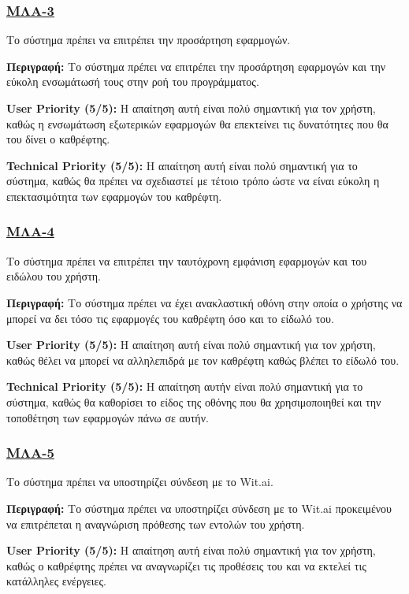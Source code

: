 \subsubsection{\underline{ΜΛΑ-3}}
\noindent Το σύστημα πρέπει να επιτρέπει την προσάρτηση εφαρμογών.

\noindent\textbf{Περιγραφή:} Το σύστημα πρέπει να επιτρέπει την προσάρτηση εφαρμογών και την εύκολη ενσωμάτωσή τους στην ροή του προγράμματος.

\noindent\textbf{User Priority (5/5):} Η απαίτηση αυτή είναι πολύ σημαντική για τον χρήστη, καθώς η ενσωμάτωση εξωτερικών εφαρμογών θα επεκτείνει τις δυνατότητες που θα του δίνει ο καθρέφτης.

\noindent\textbf{Technical Priority (5/5):} Η απαίτηση αυτή είναι πολύ σημαντική για το σύστημα, καθώς θα πρέπει να σχεδιαστεί με τέτοιο τρόπο ώστε να είναι εύκολη η επεκτασιμότητα των εφαρμογών του καθρέφτη.

\subsubsection{\underline{ΜΛΑ-4}}
\noindent Το σύστημα πρέπει να επιτρέπει την ταυτόχρονη εμφάνιση εφαρμογών και του ειδώλου του χρήστη.

\noindent\textbf{Περιγραφή:} Το σύστημα πρέπει να έχει ανακλαστική οθόνη στην οποία ο χρήστης να μπορεί να δει τόσο τις εφαρμογές του καθρέφτη όσο και το είδωλό του.

\noindent\textbf{User Priority (5/5):} Η απαίτηση αυτή είναι πολύ σημαντική για τον χρήστη, καθώς θέλει να μπορεί να αλληλεπιδρά με τον καθρέφτη καθώς βλέπει το είδωλό του.

\noindent\textbf{Technical Priority (5/5):} Η απαίτηση αυτήν είναι πολύ σημαντική για το σύστημα, καθώς θα καθορίσει το είδος της οθόνης που θα χρησιμοποιηθεί και την τοποθέτηση των εφαρμογών πάνω σε αυτήν.

\subsubsection{\underline{ΜΛΑ-5}}
\noindent Το σύστημα πρέπει να υποστηρίζει σύνδεση με το Wit.ai.

\noindent\textbf{Περιγραφή:} Το σύστημα πρέπει να υποστηρίζει σύνδεση με το Wit.ai προκειμένου να επιτρέπεται η αναγνώριση πρόθεσης των εντολών του χρήστη.

\noindent\textbf{User Priority (5/5):} Η απαίτηση αυτή είναι πολύ σημαντική για τον χρήστη, καθώς ο καθρέφτης πρέπει να αναγνωρίζει τις προθέσεις του και να εκτελεί τις κατάλληλες ενέργειες.

